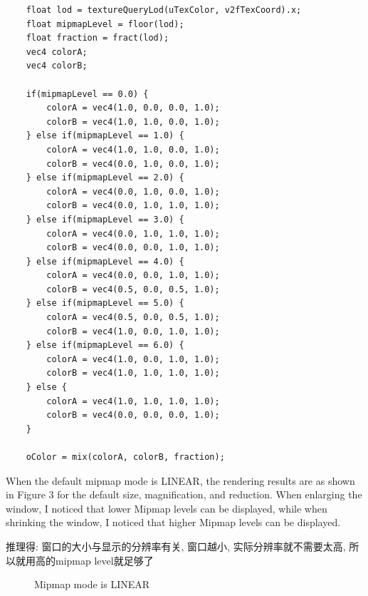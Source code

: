 \documentclass[10pt]{article}
\begin{document}
\begin{lstlisting}
    float lod = textureQueryLod(uTexColor, v2fTexCoord).x;
    float mipmapLevel = floor(lod); 
    float fraction = fract(lod); 
    vec4 colorA;
    vec4 colorB;

    if(mipmapLevel == 0.0) {
        colorA = vec4(1.0, 0.0, 0.0, 1.0);
        colorB = vec4(1.0, 1.0, 0.0, 1.0);
    } else if(mipmapLevel == 1.0) {
        colorA = vec4(1.0, 1.0, 0.0, 1.0);
        colorB = vec4(0.0, 1.0, 0.0, 1.0);
    } else if(mipmapLevel == 2.0) {
        colorA = vec4(0.0, 1.0, 0.0, 1.0);
        colorB = vec4(0.0, 1.0, 1.0, 1.0);
    } else if(mipmapLevel == 3.0) {
        colorA = vec4(0.0, 1.0, 1.0, 1.0);
        colorB = vec4(0.0, 0.0, 1.0, 1.0);
    } else if(mipmapLevel == 4.0) {
        colorA = vec4(0.0, 0.0, 1.0, 1.0);
        colorB = vec4(0.5, 0.0, 0.5, 1.0);
    } else if(mipmapLevel == 5.0) {
        colorA = vec4(0.5, 0.0, 0.5, 1.0); 
        colorB = vec4(1.0, 0.0, 1.0, 1.0); 
    } else if(mipmapLevel == 6.0) {
        colorA = vec4(1.0, 0.0, 1.0, 1.0); 
        colorB = vec4(1.0, 1.0, 1.0, 1.0); 
    } else {
        colorA = vec4(1.0, 1.0, 1.0, 1.0); 
        colorB = vec4(0.0, 0.0, 0.0, 1.0); 
    }

    oColor = mix(colorA, colorB, fraction);
\end{lstlisting}

\noindent When the default mipmap mode is LINEAR, the rendering results are as shown in Figure 3 for the default size, magnification, and reduction.
When enlarging the window, I noticed that lower Mipmap levels can be displayed, while when shrinking the window, I noticed that higher Mipmap levels can be displayed.

\noindent 推理得: 窗口的大小与显示的分辨率有关, 窗口越小, 实际分辨率就不需要太高, 所以就用高的mipmap level就足够了

\begin{figure}[htbp]
	\centering
    \caption{Mipmap mode is LINEAR}
\end{figure}
\end{document}
